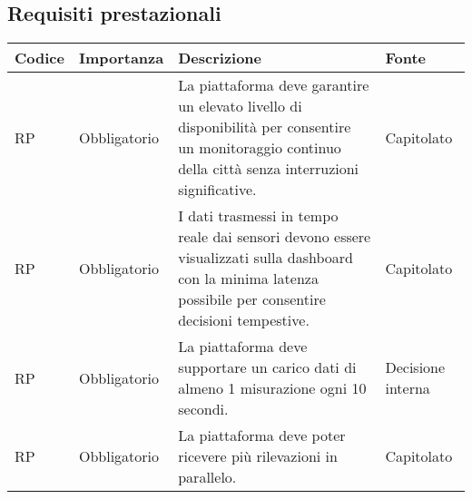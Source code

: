 \subsection{Requisiti prestazionali}
\setcounter{rowcounter}{0}
\begin{longtable}{|C{1.5cm}|C{2cm}|L{5cm}|C{2cm}|}
    \hline
    \textbf{Codice} & \textbf{Importanza} & \textbf{Descrizione} & \textbf{Fonte}  \\

    \hline
     RP & Obbligatorio & La piattaforma deve garantire un elevato livello di disponibilità per consentire un monitoraggio continuo della città senza interruzioni significative.& Capitolato \\ 

    \hline
     RP & Obbligatorio & I dati trasmessi in tempo reale dai sensori devono essere visualizzati sulla dashboard con la minima latenza possibile per consentire decisioni tempestive.& Capitolato \\

    \hline
     RP & Obbligatorio & La piattaforma deve supportare un carico dati di almeno 1 misurazione ogni 10 secondi.& Decisione interna \\

    \hline
     RP & Obbligatorio & La piattaforma deve poter ricevere più rilevazioni in parallelo.& Capitolato \\

    \hline
\end{longtable}
